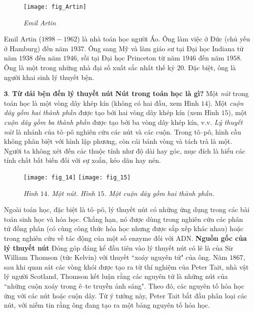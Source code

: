 \begin{multicols}{2}
	\begin{tBox}
		\begin{figure}
			\vspace*{-15pt}
			\centering
			\captionsetup{labelformat= empty, justification=centering}
			\texttt{[image: fig\_Artin]}
			\caption{\small\textit{\color{duongvaotoanhoc}Emil Artin}}
			\vspace*{-15pt}
		\end{figure}
		Emil Artin ($1898-1962$) là nhà toán học người Áo. Ông làm việc ở Đức (chủ yếu ở Hamburg) đến năm $1937$. Ông sang Mỹ và làm giáo sư tại Đại học Indiana từ năm $1938$ đến năm $1946$, rồi tại Đại học Princeton từ năm $1946$ đến năm $1958$. Ông là một trong những nhà đại số xuất sắc nhất thế kỷ $20$. Đặc biệt, ông là người khai sinh lý thuyết bện.
	\end{tBox}
	$\pmb{3.}$ \textbf{\color{duongvaotoanhoc}Từ dải bện đến lý thuyết nút}
	\vskip 0.1cm
	\textbf{\color{duongvaotoanhoc}Nút trong toán học là gì?}
	\vskip 0.1cm
	Một \textit{nút} trong toán học là một vòng dây khép kín (không có hai đầu, xem Hình $14$). Một \textit{cuộn dây gồm hai thành phần} được tạo bởi hai vòng dây khép kín (xem Hình $15$), một \textit{cuộn dây gồm ba thành phần} được tạo bởi ba vòng dây khép kín, v.v. \textit{Lý thuyết nút} là nhánh của tô--pô nghiên cứu các nút và các cuộn. Trong tô--pô, hình cầu không phân biệt với hình lập phương, còn cái bánh vòng và tách trà là một. Người ta không xét đến các thuộc tính như độ dài hay góc, mục đích là hiểu các tính chất bất biến đối với sự xoắn, kéo dãn hay nén.
	\begin{figure}[H]
		\vspace*{-10pt}
		\centering
		\captionsetup{labelformat= empty, justification=centering}
		\texttt{[image: fig\_14]}\quad
		\texttt{[image: fig\_15]}
		\caption{\small\textit{\color{duongvaotoanhoc}Hình $14$. Một nút. Hình $15$. Một cuộn dây gồm hai thành phần.}}
		\vspace*{-10pt}
	\end{figure}
	Ngoài toán học, đặc biệt là tô--pô, lý thuyết nút có những ứng dụng trong các bài toán sinh học và hóa học. Chẳng hạn, nó được dùng trong nghiên cứu các phân tử đồng phân (có cùng công thức hóa học nhưng được sắp xếp khác nhau) hoặc trong nghiên cứu về tác động của một số enzyme đối với ADN.
	\vskip 0.1cm
	\textbf{\color{duongvaotoanhoc}Nguồn gốc của lý thuyết nút}
	\vskip 0.1cm
	Đóng góp đáng kể đầu tiên vào lý thuyết nút có lẽ là của Sir William Thomson (tức Kelvin) với thuyết ``xoáy nguyên tử" của ông. Năm $1867$, sau khi quan sát các vòng khói được tạo ra từ thí nghiệm của Peter Tait, nhà vật lý người Scotland, Thomson kết luận rằng các nguyên tử là những nút của ``những cuộn xoáy trong ê--te truyền ánh sáng". Theo đó, các nguyên tố hóa học ứng với các nút hoặc cuộn dây. Từ ý tưởng này, Peter Tait bắt đầu phân loại các nút, với niềm tin rằng ông đang tạo ra một bảng nguyên tố hóa học.

\end{multicols}
